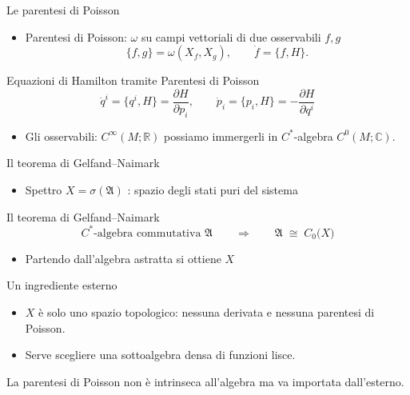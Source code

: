 \documentclass[aspectratio=169,11pt]{beamer}
\begin{document}
	\begin{frame}{Le parentesi di Poisson}
		\begin{itemize}
			\item Parentesi di Poisson: $\omega$ su campi vettoriali di due osservabili $f,g$
			\[
			\{f,g\} = \omega(X_f,X_g), \qquad \dot f = \{f,H\}.
			\]
		\end{itemize}
		\begin{block}{Equazioni di Hamilton tramite Parentesi di Poisson}
			\centering
			\[
			\dot q^i = \{q^i,H\} = \frac{\partial H}{\partial p_i}, \qquad \dot p_i = \{p_i,H\} = -\frac{\partial H}{\partial q^i}
			\]
		\end{block}
		\begin{itemize}
			\item Gli osservabili: $C^\infty(M;\mathbb{R})$ possiamo immergerli in $C^*$-algebra $C^0(M; \mathbb{C})$.
		\end{itemize}
	\end{frame}
	
	\begin{frame}{Il teorema di Gelfand--Naimark}
	\begin{itemize}
		\item Spettro $X = \sigma(\mathfrak{A})$ : spazio degli stati puri del sistema
	\end{itemize}
	\begin{block}{Il teorema di Gelfand--Naimark}
		\centering
		\[
		C^*\text{-algebra commutativa } \mathfrak{A} \qquad\Longrightarrow\qquad \mathfrak{A} \;\cong\; C_0\big(X\big)
		\]
	\end{block}
	\begin{itemize}
		\item Partendo dall'algebra astratta si ottiene $X$ 
	\end{itemize}
\end{frame}
	
	\begin{frame}{Un ingrediente esterno}
		\begin{itemize}
			\item $X$ è solo uno spazio topologico: nessuna derivata e nessuna parentesi di Poisson.
			\item Serve scegliere una sottoalgebra densa di funzioni lisce.
		\end{itemize}
		\vspace{0.4cm}
		\alert{La parentesi di Poisson non è intrinseca all'algebra ma va importata dall'esterno.}
	\end{frame}
	
\end{document}
